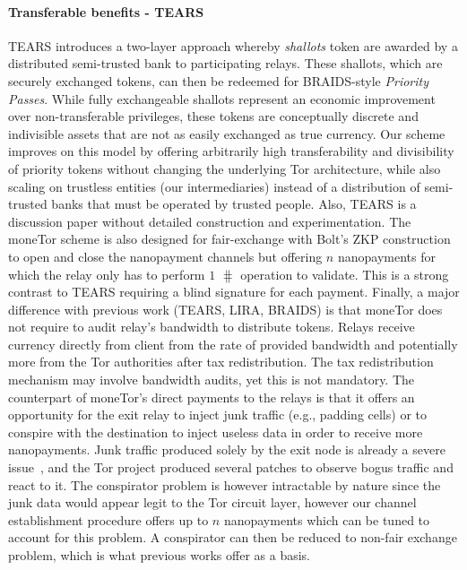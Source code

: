 \paragraph*{Transferable benefits - TEARS} TEARS introduces a two-layer approach whereby \emph{shallots}
token are awarded by a distributed semi-trusted bank to participating relays. These shallots,
which are securely exchanged tokens, can then be redeemed for BRAIDS-style
\emph{Priority Passes}. While fully exchangeable shallots represent an economic
improvement over non-transferable privileges, these tokens are conceptually
discrete and indivisible assets that are not as easily exchanged as true
currency. Our scheme improves on this model by offering arbitrarily high
transferability and divisibility of priority tokens without changing the
underlying Tor architecture, while also scaling on trustless entities (our intermediaries) instead of a distribution of semi-trusted banks that must be operated by trusted people. Also, TEARS is a discussion paper without detailed construction and experimentation. The moneTor scheme is also designed for fair-exchange with Bolt's ZKP construction to open and close the nanopayment channels but offering $n$ nanopayments for which the relay only has to perform $1$ $\hash$ operation to validate. This is a strong contrast to TEARS requiring a blind signature for each payment. Finally, a major difference with previous work (TEARS, LIRA, BRAIDS) is that moneTor does not require to audit relay's bandwidth to distribute tokens. Relays receive currency directly from client from the rate of provided bandwidth and potentially more from the Tor authorities after tax redistribution. The tax redistribution mechanism may involve bandwidth audits, yet this is not mandatory. The counterpart of moneTor's direct payments to the relays is
that it offers an opportunity for the exit relay to inject junk
traffic (e.g., padding cells) or to conspire with the destination to
inject useless data in order to receive more nanopayments. Junk
traffic produced solely by the exit node is already a severe
issue~\cite{rochet2018dropping}, and the Tor project produced several
patches to observe bogus traffic and react to it. The conspirator
problem is however intractable by nature since the junk data would
appear legit to the Tor circuit layer, however our channel establishment procedure offers up to
$n$ nanopayments which can be tuned to account for this problem.  A
conspirator can then be reduced to non-fair exchange problem, which is
what previous works offer as a basis.



